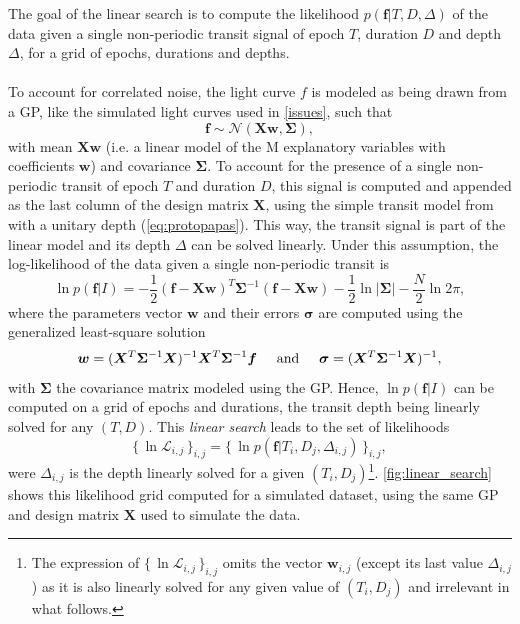 \documentclass[modern]{aastex631}
\newcommand{\set}[1]{\{\,#1\,\}}
\begin{document}
The goal of the linear search is to compute the likelihood $p(\bm{f} \vert T , D, \Delta)$ of the data given a single non-periodic transit signal of epoch $T$, duration $D$ and depth $\Delta$, for a grid of epochs, durations and depths.
\\\\
To account for correlated noise, the light curve $f$ is modeled as being drawn from a GP, like the simulated light curves used in \autoref{issues}, such that
\begin{equation*}
    \bm{f} \sim \mathcal{N}(\bm{X w}, \bm{\Sigma}),
\end{equation*}
with mean $\bm{Xw}$ (i.e. a linear model of the M explanatory variables with coefficients $\bm{w}$) and covariance $\bm{\Sigma}$. To account for the presence of a single non-periodic transit of epoch $T$ and duration $D$, this signal is computed and appended as the last column of the design matrix $\bm{X}$, using the simple transit model from \cite{protopapas} with a unitary depth (\autoref{eq:protopapas}). This way, the transit signal is part of the linear model and its depth $\Delta$ can be solved linearly. Under this assumption, the log-likelihood of the data given a single non-periodic transit is \citep{Rasmussen2005}
\begin{equation} \label{eq:linear_search_ll}
    \ln p(\bm{f} \vert I) = -\frac{1}{2}(\bm{f}-\bm{Xw})^T\bm{\Sigma}^{-1}(\bm{f}-\bm{Xw}) -  \frac{1}{2}\ln\vert\bm{\Sigma}\vert - \frac{N}{2}\ln 2\pi,
\end{equation}
where the parameters vector $\bm{w}$ and their errors $\bm{\sigma}$ are computed using the generalized least-square solution
\begin{equation}\label{eq:ls}
    \bm{w} = (\bm{X}^T\bm{\Sigma}^{-1}\bm{X})^{-1}\bm{X}^T\bm{\Sigma}^{-1}\bm{f} \hspace{0.5cm} \text{and} \hspace{0.5cm} \bm{\sigma} = (\bm{X}^T\bm{\Sigma}^{-1}\bm{X})^{-1},
\end{equation} 
with $\bm{\Sigma}$ the covariance matrix modeled using the GP. Hence, $\ln p(\bm{f} \vert I)$ can be computed on a grid of epochs and durations, the transit depth being linearly solved for any $(T, D)$. This \textit{linear search} leads to the set of likelihoods
\begin{equation*}
    \set{\ln\mathcal{L}_{i,j}}_{i, j} = \set{\ln p(\bm{f} \vert T_i ,D_j, \Delta_{i,j})}_{i, j},
\end{equation*}
were $\Delta_{i,j}$ is the depth linearly solved for a given $(T_i, D_j)$\footnote{The expression of $\set{\ln\mathcal{L}_{i,j}}_{i, j}$ omits the vector $\bm{w}_{i,j}$ (except its last value $\Delta_{i,j}$) as it is also linearly solved for any given value of $(T_i, D_j)$ and irrelevant in what follows.}. \autoref{fig:linear_search} shows this likelihood grid computed for a simulated dataset, using the same GP  and design matrix $\bm{X}$ used to simulate the data.
\end{document}
